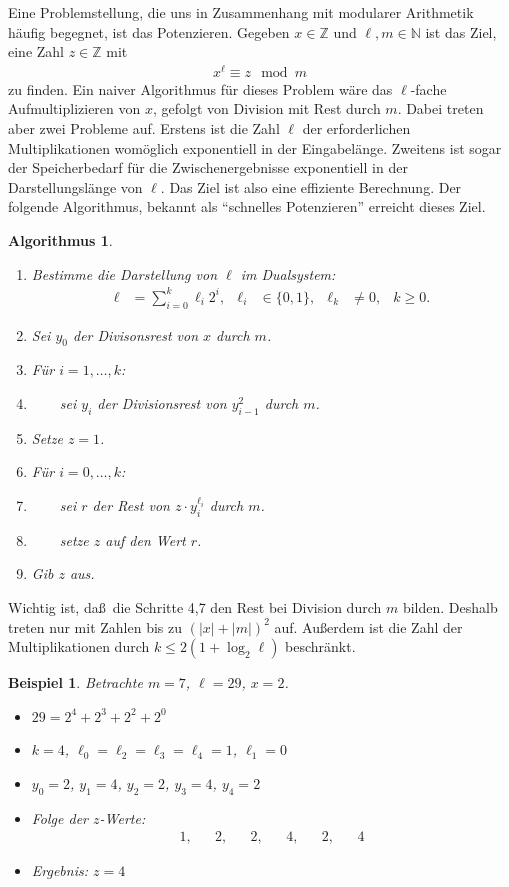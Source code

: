 \documentclass[10pt,reqno]{amsart}
\numberwithin{equation}{section}
\renewcommand\ae{\"a}
\newcommand\ue{\"u}
\newcommand\NN{\mathbb N}
\newcommand\ZZ{\mathbb Z}
\newtheorem{example}[definition]{Beispiel}
\newtheorem{algorithm}[definition]{Algorithmus}
\begin{document}
Eine Problemstellung, die uns in Zusammenhang mit modularer Arithmetik h\"aufig begegnet, ist das Potenzieren.
Gegeben $x\in\ZZ$ und $\ell,m\in\NN$ ist das Ziel, eine Zahl $z\in\ZZ$ mit
				\begin{align*}
					x^\ell\equiv z\mod m
				\end{align*}
zu finden.
Ein naiver Algorithmus f\"ur dieses Problem w\"are das $\ell$-fache Aufmultiplizieren von $x$, gefolgt von Division mit Rest durch $m$.
Dabei treten aber zwei Probleme auf.
Erstens ist die Zahl $\ell$ der erforderlichen Multiplikationen wom\"oglich exponentiell in der Eingabel\"ange.
Zweitens ist sogar der Speicherbedarf f\"ur die Zwischenergebnisse exponentiell in der Darstellungsl\"ange von $\ell$.
Das Ziel ist also eine effiziente Berechnung.
Der folgende Algorithmus, bekannt als ``schnelles Potenzieren'' erreicht dieses Ziel.

\begin{algorithm}\label{alg_exp}
		\begin{enumerate}
			\item Bestimme die Darstellung von $\ell$ im Dualsystem:
				\begin{align*}
					\ell&=\sum_{i=0}^k\ell_i2^i,&\ell_i&\in\{0,1\},&\ell_k&\neq0,&k\geq0.
				\end{align*}
			\item Sei $y_0$ der Divisonsrest von $x$ durch $m$.
			\item F\ue r $i=1,\ldots,k$:
			\item $\qquad$sei $y_i$ der Divisionsrest von $y_{i-1}^2$ durch $m$.
			\item Setze $z=1$.
			\item F\ue r $i=0,\ldots,k$:
			\item $\qquad$sei $r$ der Rest von $z\cdot y_i^{\ell_i}$ durch $m$.
			\item $\qquad$setze $z$ auf den Wert $r$.
			\item Gib $z$ aus.
		\end{enumerate}
	\end{algorithm}

Wichtig ist, da\ss\ die Schritte 4,7 den Rest bei Division durch $m$ bilden.
Deshalb treten nur mit Zahlen bis zu $(|x|+|m|)^2$ auf.
Au\ss erdem ist	die Zahl der Multiplikationen durch $k\leq2(1+\log_2\ell)$ beschr\ae nkt.

\begin{example}
		Betrachte $m=7$, $\ell=29$, $x=2$.
	\begin{itemize}
		\item $29=2^4+2^3+2^2+2^0$
		\item $k=4$, $\ell_0=\ell_2=\ell_3=\ell_4=1$, $\ell_1=0$
		\item $y_0=2$, $y_1=4$, $y_2=2$, $y_3=4$, $y_4=2$ 
		\item Folge der $z$-Werte:
			\begin{align*}
				1,&&2,&&2,&&4,&&2,&&4
			\end{align*}
		\item \emph{Ergebnis:} $z=4$
	\end{itemize}
\end{example}
\end{document}
